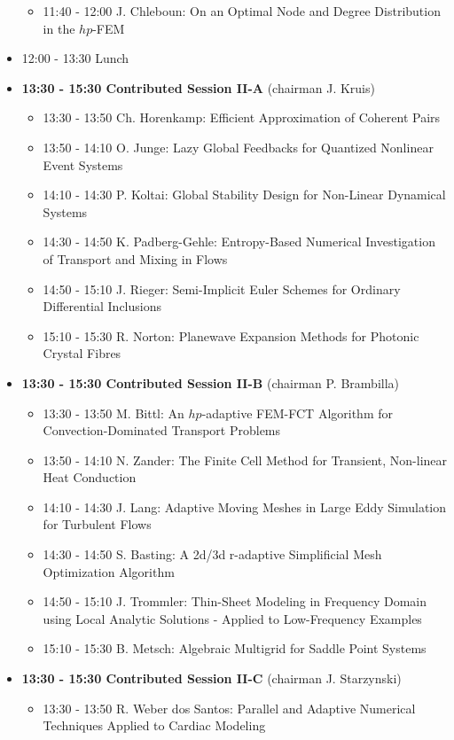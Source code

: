 \documentclass[10pt, A4]{article}%
\begin{document}
\begin{itemize}
\begin{itemize}
    \item 11:40 - 12:00 J. Chleboun: On an Optimal Node and Degree Distribution in the $hp$-FEM
  \end{itemize}
  \item 12:00 - 13:30 Lunch
  \item {\bf 13:30 - 15:30 Contributed Session II-A} (chairman J. Kruis) 
  \begin{itemize}
    \item 13:30 - 13:50 Ch. Horenkamp: Efficient Approximation of Coherent Pairs
    \item 13:50 - 14:10 O. Junge: Lazy Global Feedbacks for Quantized Nonlinear Event Systems
    \item 14:10 - 14:30 P. Koltai: Global Stability Design for Non-Linear Dynamical Systems
    \item 14:30 - 14:50 K. Padberg-Gehle: Entropy-Based Numerical Investigation of Transport and Mixing in Flows
    \item 14:50 - 15:10 J. Rieger: Semi-Implicit Euler Schemes for Ordinary Differential Inclusions
    \item 15:10 - 15:30 R. Norton: Planewave Expansion Methods for Photonic Crystal Fibres
  \end{itemize}
  \item {\bf 13:30 - 15:30 Contributed Session II-B} (chairman P. Brambilla) 
  \begin{itemize}
    \item 13:30 - 13:50 M. Bittl: An $hp$-adaptive FEM-FCT Algorithm for Convection-Dominated Transport Problems
    \item 13:50 - 14:10 N. Zander: The Finite Cell Method for Transient, Non-linear Heat Conduction
    \item 14:10 - 14:30 J. Lang: Adaptive Moving Meshes in Large Eddy Simulation for Turbulent Flows
    \item 14:30 - 14:50 S. Basting: A 2d/3d r-adaptive Simplificial Mesh Optimization Algorithm
    \item 14:50 - 15:10 J. Trommler: Thin-Sheet Modeling in Frequency Domain using Local Analytic Solutions - Applied to Low-Frequency Examples
    \item 15:10 - 15:30 B. Metsch: Algebraic Multigrid for Saddle Point Systems
  \end{itemize}
\newpage
    \item {\bf 13:30 - 15:30 Contributed Session II-C} (chairman J. Starzynski) 
  \begin{itemize}
    \item 13:30 - 13:50 R. Weber dos Santos: Parallel and Adaptive Numerical Techniques Applied to Cardiac Modeling

\end{itemize}
\end{itemize}
\end{document}
